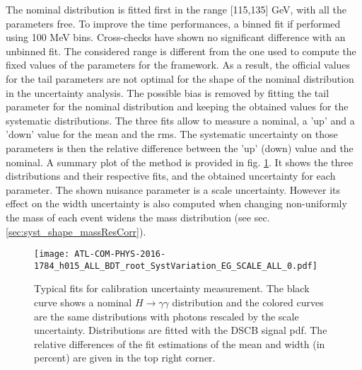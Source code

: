 The nominal distribution is fitted first in the range [115,135] GeV, with all the parameters free.
To improve the time performances, a binned fit if performed using 100 MeV bins.
Cross-checks have shown no significant difference with an unbinned fit.
The considered range is different from the one used to compute the fixed values of the parameters for the framework.
As a result, the official values for the tail parameters are not optimal for the shape of the nominal distribution in the uncertainty analysis.
The possible bias is removed by fitting the tail parameter for the nominal distribution and keeping the obtained values for the systematic distributions.
The three fits allow to measure a nominal, a 'up' and a 'down' value for the mean and the rms.
The systematic uncertainty on those parameters is then the relative difference between the 'up' (down) value and the nominal.
A summary plot of the method is provided in fig. \ref{fig:org356a158}.
It shows the three distributions and their respective fits, and the obtained uncertainty for each parameter.
The shown nuisance parameter is a scale uncertainty.
However its effect on the width uncertainty is also computed when changing non-uniformly the mass of each event widens the mass distribution (see sec. \ref{sec:syst_shape_massResCorr}).


\begin{figure}[htbp]
\centering
\texttt{[image: ATL-COM-PHYS-2016-1784\_h015\_ALL\_BDT\_root\_SystVariation\_EG\_SCALE\_ALL\_0.pdf]}
\caption{\label{fig:org356a158}
  Typical fits for calibration uncertainty measurement.
  The black curve shows a nominal $H\rightarrow\gamma\gamma$ distribution and the colored curves are the same distributions with photons rescaled by the scale uncertainty.
  Distributions are fitted with the DSCB signal pdf.
  The relative differences of the fit estimations of the mean and width (in percent) are given in the top right corner.}
\end{figure}

